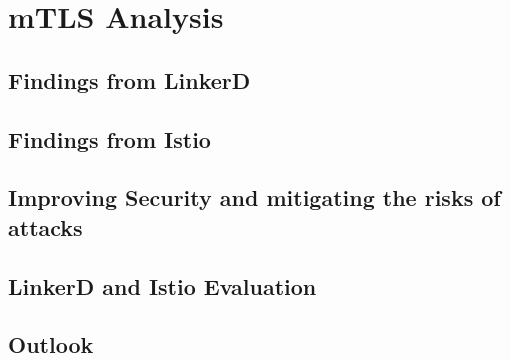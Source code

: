 %
%

\pagebreak
\section{mTLS Analysis}

\onehalfspacing

\subsection{Findings from LinkerD}

\subsection{Findings from Istio}

\subsection{Improving Security and mitigating the risks of attacks}

\subsection{LinkerD and Istio Evaluation}

\subsection{Outlook}
